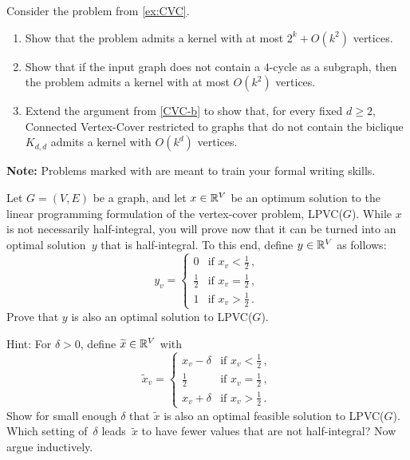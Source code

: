 \documentclass{uebung_cs}
\begin{document}
\begin{exercise}
  Consider the problem from \ref{ex:CVC}.
  \begin{enumerate}
      \item Show that the problem admits a kernel with at most $2^k + O(k^2)$ vertices.
      \item\label{CVC-b} Show that if the input graph does not contain a $4$-cycle as a subgraph, then the problem admits a
      kernel with at most $O(k^2)$ vertices.
      \item Extend the argument from \ref{CVC-b} to show that, for every fixed $d \geq 2$, Connected Vertex-Cover restricted to graphs that do not contain the biclique $K_{d,d}$ admits a kernel with $O(k^d)$ vertices.
  \end{enumerate}
\end{exercise}

\newpage
\textbf{Note:} Problems marked with \schriftlich are meant to train your formal writing skills.

\begin{exercise}
  Let $G = (V, E)$ be a graph, and let $x \in \mathbb{R}^V$ be an
  optimum solution to the linear programming formulation of the vertex-cover problem, LPVC($G$). While $x$ is not necessarily half-integral, you will prove now that it can be turned into an optimal solution~$y$ that is half-integral. To this end, define
  $y\in\mathbb{R}^V$ as follows:
  \[
  y_v = \begin{cases}
  0 & \text{if } x_v < \frac{1}{2}\,, \\
  \frac{1}{2} & \text{if } x_v = \frac{1}{2}\,, \\
  1 & \text{if } x_v > \frac{1}{2}\,.
  \end{cases}
  \]
  Prove that $y$ is also an optimal solution to LPVC($G$).

  Hint: For $\delta>0$, define $\widetilde x\in\mathbb{R}^V$ with\[
    \widetilde x_v = \begin{cases}
    x_v-\delta & \text{if } x_v < \frac{1}{2}\,, \\
    \frac{1}{2} & \text{if } x_v = \frac{1}{2}\,, \\
    x_v+\delta & \text{if } x_v > \frac{1}{2}\,.
    \end{cases}
    \]
    Show for small enough $\delta$ that $\widetilde x$ is also an optimal feasible solution to LPVC($G$). Which setting of~$\delta$ leads~$\widetilde x$ to have fewer values that are not half-integral? Now argue inductively.
\end{exercise}
\end{document}
